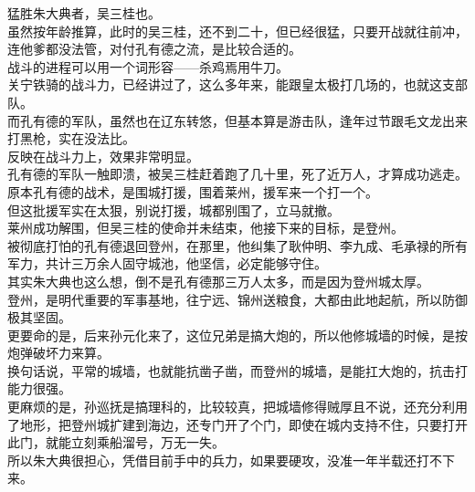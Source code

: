 \begin{multicols}{\theparacolNo}
猛胜朱大典者，吴三桂也。\\

虽然按年龄推算，此时的吴三桂，还不到二十，但已经很猛，只要开战就往前冲，连他爹都没法管，对付孔有德之流，是比较合适的。\\

战斗的进程可以用一个词形容——杀鸡焉用牛刀。\\

关宁铁骑的战斗力，已经讲过了，这么多年来，能跟皇太极打几场的，也就这支部队。\\

而孔有德的军队，虽然也在辽东转悠，但基本算是游击队，逢年过节跟毛文龙出来打黑枪，实在没法比。\\

反映在战斗力上，效果非常明显。\\

孔有德的军队一触即溃，被吴三桂赶着跑了几十里，死了近万人，才算成功逃走。\\

原本孔有德的战术，是围城打援，围着莱州，援军来一个打一个。\\

但这批援军实在太狠，别说打援，城都别围了，立马就撤。\\

莱州成功解围，但吴三桂的使命并未结束，他接下来的目标，是登州。\\

被彻底打怕的孔有德退回登州，在那里，他纠集了耿仲明、李九成、毛承禄的所有军力，共计三万余人固守城池，他坚信，必定能够守住。\\

其实朱大典也这么想，倒不是孔有德那三万人太多，而是因为登州城太厚。\\

登州，是明代重要的军事基地，往宁远、锦州送粮食，大都由此地起航，所以防御极其坚固。\\

更要命的是，后来孙元化来了，这位兄弟是搞大炮的，所以他修城墙的时候，是按炮弹破坏力来算。\\

换句话说，平常的城墙，也就能抗凿子凿，而登州的城墙，是能扛大炮的，抗击打能力很强。\\

更麻烦的是，孙巡抚是搞理科的，比较较真，把城墙修得贼厚且不说，还充分利用了地形，把登州城扩建到海边，还专门开了个门，即使在城内支持不住，只要打开此门，就能立刻乘船溜号，万无一失。\\

所以朱大典很担心，凭借目前手中的兵力，如果要硬攻，没准一年半载还打不下来。\\


\end{multicols}
